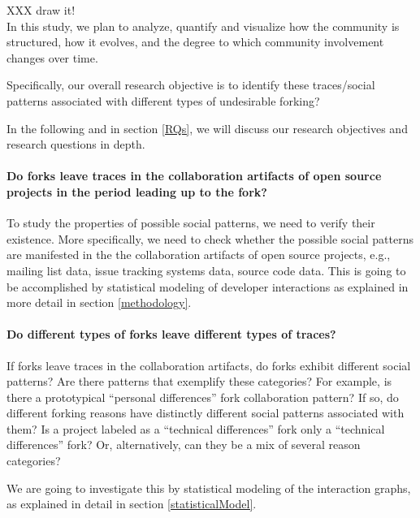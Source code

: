 \documentclass[11pt]{report}
\begin{document}
XXX draw it!\\

In this study, we plan to analyze, quantify and visualize how the community is structured, how it evolves, and the degree to which community involvement changes over time.

Specifically, our overall research objective is to identify these traces/social patterns associated with different types of undesirable forking?

In the following and in section \ref{RQs}, we will discuss our research objectives and research questions in depth.

\paragraph*{\hspace{4 mm} Do forks leave traces in the collaboration artifacts of open source projects in the period leading up to the fork?\\}

To study the properties of possible social patterns, we need to verify their existence. More specifically, we need to check whether the possible social patterns are manifested in the the collaboration artifacts of open source projects, e.g., mailing list data, issue tracking systems data, source code data. This is going to be accomplished by statistical modeling of developer interactions as explained in more detail in section \ref{methodology}.

\paragraph*{\hspace{4 mm} Do different types of forks leave different types of traces?\\}

If forks leave traces in the collaboration artifacts, do forks exhibit different social patterns? Are there patterns that exemplify these categories? For example, is there a prototypical ``personal differences'' fork collaboration pattern? If so, do different forking reasons have distinctly different social patterns associated with them? Is a project labeled as a ``technical differences'' fork only a ``technical differences'' fork? Or, alternatively, can they be a mix of several reason categories?

We are going to investigate this by statistical modeling of the interaction graphs, as explained in detail in section \ref{statisticalModel}.
\end{document}
